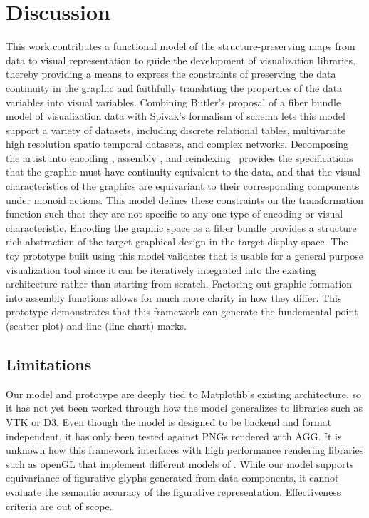 \documentclass[journal]{vgtc}                %
\begin{document}
\section{Discussion}
This work contributes a functional model of the structure-preserving maps from data to visual representation to guide the development of visualization libraries, thereby providing a means to express the constraints of preserving the data continuity in the graphic and faithfully translating the properties of the data variables into visual variables. Combining Butler's proposal of a fiber bundle model of visualization data with Spivak's formalism of schema lets this model support a variety of datasets, including  discrete relational tables, multivariate high resolution spatio temporal datasets, and complex networks. Decomposing the artist into encoding \vchannel, assembly \vmark, and reindexing \vindex\ provides the specifications that the graphic must have continuity equivalent to the data, and that the visual characteristics of the graphics are equivariant to their corresponding components under monoid actions. This model defines these constraints on the transformation function such that they are not specific to any one type of encoding or visual characteristic. Encoding the graphic space as a fiber bundle provides a structure rich abstraction of the target graphical design in the target display space. The toy prototype built using this model validates that is usable for a general purpose visualization tool since it can be iteratively integrated into the existing architecture rather than starting from scratch. Factoring out graphic formation into assembly functions allows for much more clarity in how they differ. This prototype demonstrates that this framework can generate the fundemental point (scatter plot) and line (line chart) marks. 

\subsection{Limitations}
Our model and prototype are deeply tied to Matplotlib's existing architecture, so it has not yet been worked through how the model generalizes to libraries such as VTK or D3. Even though the model is designed to be backend and format independent, it has only been tested against PNGs rendered with AGG\cite{shemanarevAntiGrainGeometry}. It is unknown how this framework interfaces with high performance rendering libraries such as openGL\cite{CarsonOpenGL1997} that implement different models of \gsection. While our model supports equivariance of figurative glyphs \cite{byrneAcquiredCodesMeaning2016} generated from data components\cite{beckfeathers2014,byrneFigurativeFramesCritical2017}, it cannot evaluate the semantic accuracy of the figurative representation. Effectiveness criteria\cite{mackinlayAutomaticDesignGraphical1987,chambersGraphicalMethodsData1983a} are out of scope.
\end{document}
